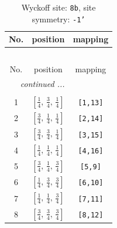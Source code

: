 \documentclass[fleqn,8pt]{jsarticle}
\begin{document}
\begin{longtable}{ccc}
\caption{Wyckoff site: {\tt 8b}, site symmetry: {\tt -1'}}
 \\
 \hline \hline
No. & position & mapping \\ \hline \endfirsthead

\multicolumn{2}{l}{\tablename\ \thetable{}} \\
 \hline \hline
No. & position & mapping \\ \hline \endhead

 \hline \hline
\multicolumn{2}{r}{\footnotesize\it continued ...} \\ \endfoot

 \hline \hline
\multicolumn{2}{r}{} \\ \endlastfoot

1 & $\left[ \frac{1}{4},\, \frac{3}{4},\, \frac{1}{4} \right]$ & {\tt [1,13]} \\ \hline
2 & $\left[ \frac{3}{4},\, \frac{1}{4},\, \frac{1}{4} \right]$ & {\tt [2,14]} \\ \hline
3 & $\left[ \frac{3}{4},\, \frac{3}{4},\, \frac{1}{4} \right]$ & {\tt [3,15]} \\ \hline
4 & $\left[ \frac{1}{4},\, \frac{1}{4},\, \frac{1}{4} \right]$ & {\tt [4,16]} \\ \hline
5 & $\left[ \frac{3}{4},\, \frac{1}{4},\, \frac{3}{4} \right]$ & {\tt [5,9]} \\ \hline
6 & $\left[ \frac{1}{4},\, \frac{3}{4},\, \frac{3}{4} \right]$ & {\tt [6,10]} \\ \hline
7 & $\left[ \frac{1}{4},\, \frac{1}{4},\, \frac{3}{4} \right]$ & {\tt [7,11]} \\ \hline
8 & $\left[ \frac{3}{4},\, \frac{3}{4},\, \frac{3}{4} \right]$ & {\tt [8,12]} \\
\end{longtable}
\renewcommand{\arraystretch}{1.2}
\end{document}

